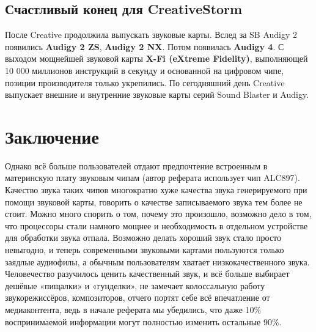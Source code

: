 \documentclass[a4paper,12pt]{extarticle}
\begin{document}
    \subsection{Счастливый конец для CreativeStorm}
    После Creative продолжила выпускать звуковые карты. Вслед за SB Audigy 2 появились \textbf{Audigy 2 ZS}, \textbf{Audigy 2 NX}. Потом появилась \textbf{Audigy 4}. С выходом мощнейшей звуковой карты \textbf{X-Fi (eXtreme Fidelity)}, выполняющей 10 000 миллионов инструкций в секунду и основанной на цифровом чипе, позиции производителя только укрепились. По сегодняшний день Creative выпускает внешние и внутренние звуковые карты серий Sound Blaster и Audigy.
    \newpage


    \section{Заключение}
    Однако всё больше пользователей отдают предпочтение встроенным в материнскую плату звуковым чипам (автор реферата использует чип ALC897). Качество звука таких чипов многократно хуже качества звука генерируемого при помощи звуковой карты, говорить о качестве записываемого звука тем более не стоит. Можно много спорить о том, почему это произошло, возможно дело в том, что процессоры стали намного мощнее и необходимость в отдельном устройстве для обработки звука отпала. Возможно делать хороший звук стало просто невыгодно, и теперь современными звуковыми картами пользуются только заядлые аудиофилы, а обычным пользователям хватает низкокачественного звука. Человечество разучилось ценить качественный звук, и всё больше выбирает дешёвые «пищалки» и «гунделки», не замечает колоссальную работу звукорежиссёров, композиторов, отчего портят себе всё впечатление от медиаконтента, ведь в начале реферата мы убедились, что даже 10\% воспринимаемой информации могут полностью изменить остальные 90\%.
    \newpage
\end{document}
